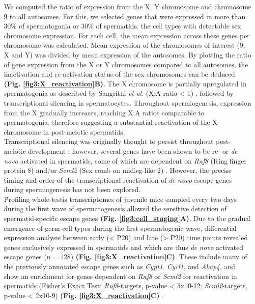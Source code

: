 \newpage

We computed the ratio of expression from the X, Y chromosome and chromosome 9 to all autosomes. For this, we selected genes that were expressed in more than 30\% of spermatogonia or 30\% of spermatids, the cell types with detectable sex chromosome expression. For each cell, the mean expression across these genes per chromosome was calculated. Mean expression of the chromosomes of interest (9, X and Y) was divided by mean expression of the autosomes. By plotting the ratio of gene expression from the X or Y chromosomes compared to all autosomes, the inactivation and re-activation status of the sex chromosomes can be deduced \textbf{(Fig. \ref{fig3:X_reactivation}B)}. The X chromosome is partially upregulated in spermatogonia as described by Sangrithi \emph{et al.} (X:A ratio < 1) \citep{Sangrithi2017}, followed by transcriptional silencing in spermatocytes. Throughout spermiogenesis, expression from the X gradually increases, reaching X:A ratios comparable to spermatogonia, therefore suggesting a substantial reactivation of the X chromosome in post-meiotic spermatids. \\

Transcriptional silencing was originally thought to persist throughout post-meiotic development \citep{Greaves2006, Turner2006}; however, several genes have been shown to be re- or \emph{de novo} activated in spermatids, some of which are dependent on \textit{Rnf8} (Ring finger protein 8) and/or \textit{Scml2} (Sex comb on midleg-like 2) \citep{Hasegawa2015, Sin2012, Sin2015}. However, the precise timing and order of the transcriptional reactivation of \emph{de novo} escape genes during spermiogenesis has not been explored. \\
Profiling whole-testis transcriptomes of juvenile mice sampled every two days during the first wave of spermatogenesis allowed the sensitive detection of spermatid-specific escape genes \textbf{(Fig. \ref{fig3:cell_staging}A)}. Due to the gradual emergence of germ cell types during the first spermatogenic wave, differential expression analysis between early (< P20) and late (> P20) time points revealed genes exclusively expressed in spermatids and which are thus \emph{de novo} activated escape genes (n = 128) \textbf{(Fig. \ref{fig3:X_reactivation}C)}. These include many of the previously annotated escape genes such as \textit{Cypt1}, \textit{Cycl1}, and \textit{Akap4}, and show an enrichment for genes dependent on \textit{Rnf8} or \textit{Scml2} for reactivation in spermatids (Fisher's Exact Test: \textit{Rnf8}-targets, p-value < 5x10-12; \textit{Scml2}-targets, p-value < 2x10-9) \textbf{(Fig. \ref{fig3:X_reactivation}C)} \citep{Adams2018}. 

